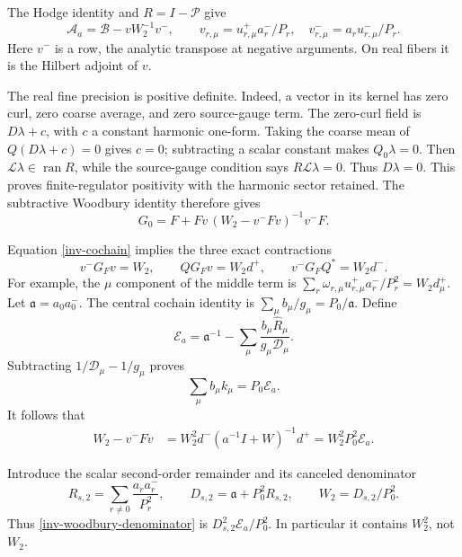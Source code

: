 The Hodge identity and $R=I-\mathcal P$ give
\begin{equation}\label{inv-rank-subtraction}
 \mathcal A_a=\mathcal B-vW_2^{-1}v^-,\qquad
 v_{r,\mu}=u_{r,\mu}^+a_r^-/P_r,
 \quad v_{r,\mu}^-=a_ru_{r,\mu}^-/P_r.
\end{equation}
Here $v^-$ is a row, the analytic transpose at negative arguments.
On real fibers it is the Hilbert adjoint of $v$.

The real fine precision is positive definite. Indeed, a vector in its
kernel has zero curl, zero coarse average, and zero source-gauge term.
The zero-curl field is $D\lambda+c$, with $c$ a constant harmonic
one-form. Taking the coarse mean of $Q(D\lambda+c)=0$ gives $c=0$;
subtracting a scalar constant makes $Q_0\lambda=0$. Then
$\mathcal L\lambda\in\operatorname{ran}R$, while the source-gauge
condition says $R\mathcal L\lambda=0$. Thus $D\lambda=0$.
This proves finite-regulator positivity with the harmonic sector
retained. The subtractive Woodbury identity therefore gives
\begin{equation}\label{inv-G-woodbury}
 G_0=F+Fv\,(W_2-v^-Fv)^{-1}v^-F.
\end{equation}

Equation \eqref{inv-cochain} implies the three exact contractions
\begin{equation}\label{inv-three-contractions}
 v^-G_Fv=W_2,\qquad QG_Fv=W_2d^+,
 \qquad v^-G_FQ^*=W_2d^-.
\end{equation}
For example, the $\mu$ component of the middle term is
$\sum_r\omega_{r,\mu}u_{r,\mu}^+a_r^-/P_r^2=W_2d_\mu^+$.
Let $\mathfrak a=a_0a_0^-$. The central cochain identity is
$\sum_\mu b_\mu/g_\mu=P_0/\mathfrak a$. Define
\begin{equation}\label{inv-Ea}
 \mathcal E_a=\mathfrak a^{-1}
 -\sum_\mu\frac{b_\mu\widehat R_\mu}{g_\mu\mathcal D_\mu}.
\end{equation}
Subtracting $1/\mathcal D_\mu-1/g_\mu$ proves
\begin{equation}\label{inv-Ea-identity}
 \sum_\mu b_\mu k_\mu=P_0\mathcal E_a.
\end{equation}
It follows that
\begin{align}
 W_2-v^-Fv
 &=W_2^2d^-(a^{-1}I+W)^{-1}d^+
  =W_2^2P_0^2\mathcal E_a.
 \label{inv-woodbury-denominator}
\end{align}

Introduce the scalar second-order remainder and its canceled denominator
\begin{equation}\label{inv-Ds2}
 R_{s,2}=\sum_{r\ne0}\frac{a_ra_r^-}{P_r^2},\qquad
 D_{s,2}=\mathfrak a+P_0^2R_{s,2},\qquad
 W_2=D_{s,2}/P_0^2.
\end{equation}
Thus \eqref{inv-woodbury-denominator} is
$D_{s,2}^2\mathcal E_a/P_0^2$. In particular it contains $W_2^2$,
not $W_2$.

